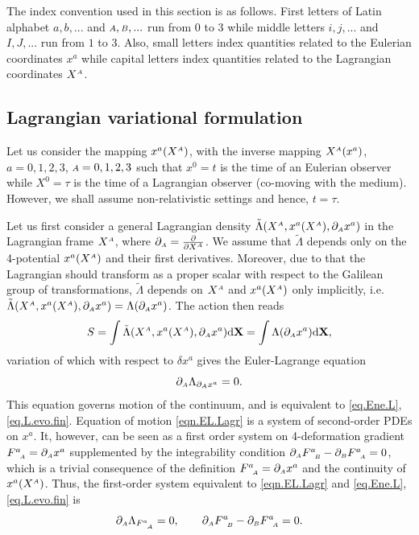 \documentclass[
10pt, %
a4paper, %
oneside, %
headinclude,footinclude, %
BCOR5mm, %
]{scrartcl}
\newcommand{\XX}{\mathbf{X}}
\newcommand{\dX}{\mathrm{d}\XX}
\newcommand{\sA}{{\mathsmaller A}}
\newcommand{\sB}{{\mathsmaller B}}
\newcommand{\pd}{\partial}
\newcommand{\F}[2]{F^{#1}_{\ \, \mathsmaller#2}}
\begin{document}
The index convention used in this section is as follows. First letters of Latin 
alphabet $ a,b,... 
$ and $ 
\sA,\sB,... $ run from $ 0 $ to $ 3 $  while middle letters $ i,j,... $ and $ I,J,... $ run from $ 
1 $ to $ 3 $. Also, small letters index quantities related to the Eulerian coordinates $ x^a $ 
while capital letters index quantities related to the Lagrangian coordinates $ X^\sA $.


\subsection{Lagrangian variational formulation}\label{sec.variation.Lagr}

Let us consider the mapping $x^a(X^\sA)$, with the inverse mapping $ X^\sA(x^a) $,  $a=0,1,2,3$, 
$\sA=0,1,2,3$ such that $x^0=t$ is the time of an Eulerian observer while $X^0 = \tau$ is the time 
of a Lagrangian observer (co-moving with the medium). However, we shall assume 
non-relativistic settings 
and hence, $ t = \tau $. 

Let us first consider a general Lagrangian density $ \tilde{\Lambda}(X^\sA,x^a(X^\sA),\pd_\sA x^a) 
$ in the 
Lagrangian 
frame $ X^\sA $, where $ \pd_\sA = \frac{\pd}{\pd X^\sA} $. We assume that $ 
\tilde{\Lambda} $ depends only on the 4-potential 
$ x^a(X^\sA) $ and their first derivatives. Moreover, due to that the Lagrangian should transform 
as a proper scalar with respect to the Galilean group of transformations, $ \tilde{\Lambda} $ 
depends on $ X^\sA $ and $ x^a(X^\sA) $ 
only implicitly, i.e.
$ \tilde{\Lambda}(X^\sA,x^a(X^\sA),\pd_\sA x^a) = \Lambda(\pd_\sA x^a) $.
 The action then reads
\begin{equation}
S = \int \tilde{\Lambda}(X^\sA,x^a(X^\sA),\pd_\sA x^a)\dX = \int \Lambda(\pd_\sA x^a)\dX,
\end{equation}
variation of which with respect to $ \delta x^a $ gives the Euler-Lagrange equation
\begin{equation}\label{eqn.EL.Lagr}
\pd_\sA \Lambda_{\pd_{\sA} x^a} = 0.
\end{equation}
This equation governs motion of the continuum,
and is equivalent to \eqref{eq.Ene.L}, \eqref{eq.L.evo.fin}. Equation of motion 
\eqref{eqn.EL.Lagr} 
is
a system of second-order PDEs on $ x^a $. It, however, can be seen as a first order system on 
4-deformation gradient $ 
\F{a}{A} = \pd_\sA x^a$ supplemented by the integrability condition 
$ \pd_\sA \F{a}{B} - \pd_\sB \F{a}{A} = 0$,
which is a trivial consequence of the definition $ \F{a}{A} = \pd_\sA x^a $ and 
the continuity of $ x^a(X^\sA) $. Thus, the first-order 
system equivalent to \eqref{eqn.EL.Lagr} and \eqref{eq.Ene.L}, \eqref{eq.L.evo.fin} is
\begin{equation}\label{eqn.EL.Lagr.extend}
\pd_\sA \Lambda_{\F{a}{A}} = 0, \qquad \pd_\sA \F{a}{B} - \pd_\sB \F{a}{A} = 0.
\end{equation}
\end{document}
